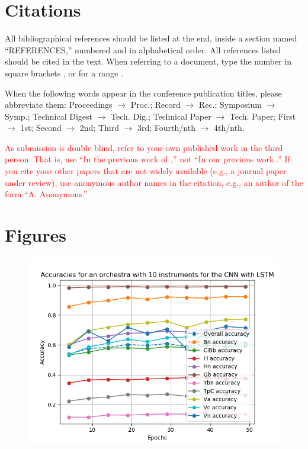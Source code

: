 \documentclass{article}
\begin{document}
\section{Citations}

All bibliographical references should be listed at the end,
inside a section named ``REFERENCES,'' numbered and in alphabetical order.
All references listed should be cited in the text.
When referring to a document, type the number in square brackets
\cite{Author:00}, or for a range \cite{Author:00,Someone:10,Someone:04}.

When the following words appear in the conference publication titles, please abbreviate them: Proceedings $\rightarrow$ Proc.; Record $\rightarrow$ Rec.; Symposium $\rightarrow$ Symp.; Technical Digest $\rightarrow$ Tech. Dig.; Technical Paper $\rightarrow$ Tech. Paper; First $\rightarrow$ 1st; Second $\rightarrow$ 2nd; Third $\rightarrow$ 3rd; Fourth/nth $\rightarrow$ 4th/nth.

\textcolor{red}{As submission is double blind, refer to your own published work in the third person. That is, use ``In the previous work of \cite{Someone:10},'' not ``In our previous work \cite{Someone:10}.'' If you cite your other papers that are not widely available (e.g., a journal paper under review), use anonymous author names in the citation, e.g., an author of the form ``A. Anonymous.''}

\section{Figures}

\begin{figure}
\includegraphics[scale=0.6]{figs/CNN10.png}
\end{figure}
\end{document}
